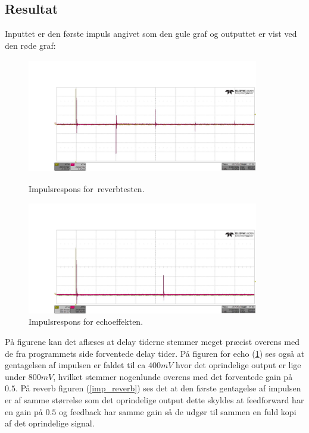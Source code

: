 \subsection{Resultat}
Inputtet er den første impuls angivet som den gule graf og outputtet er vist ved den røde graf:
\begin{figure}[!ht]
		\centering
	\begin{minipage}{0.50\textwidth}
		\centering
		\includegraphics[width=0.9\textwidth, height=5cm]{billeder/reverb.png}
		\caption{Impulsrespons for reverbtesten.}
		\label{fig:imp_reverb}
	\end{minipage}\hfill
	\begin{minipage}{0.50\textwidth}
		\centering
		\includegraphics[width=0.9\textwidth, height=5 cm]{billeder/echo.png}
		\caption{Impulsrespons for echoeffekten.}
		\label{fig:imp_echo}
	\end{minipage}
\end{figure}
På figurene kan det aflæses at delay tiderne stemmer meget præcist overens med de fra programmets side forventede delay tider. På figuren for echo (\ref{fig:imp_echo}) ses også at gentagelsen af impulsen er faldet til ca $400\si{mV}$ hvor det oprindelige output er lige under $800\si{mV}$, hvilket stemmer nogenlunde overens med det forventede gain på $0.5$.\newline 
På reverb figuren (\ref{imp_reverb}) ses det at den første gentagelse af impulsen er af samme størrelse som det oprindelige output dette skyldes at feedforward har en gain på $0.5$ og feedback har samme gain så de udgør til sammen en fuld kopi af det oprindelige signal. 
